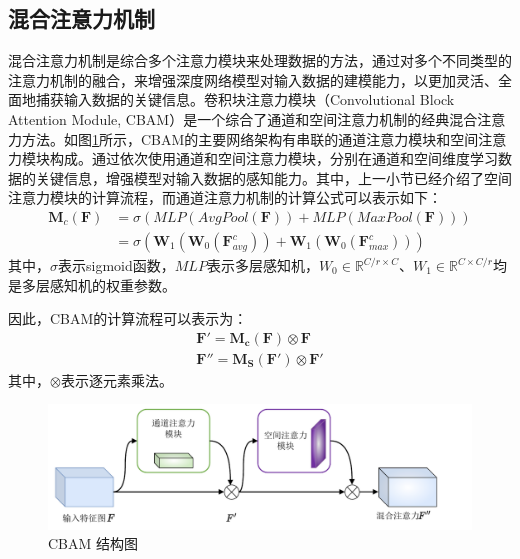 \subsection{混合注意力机制}
混合注意力机制是综合多个注意力模块来处理数据的方法，通过对多个不同类型的注意力机制的融合，来增强深度网络模型对输入数据的建模能力，以更加灵活、全面地捕获输入数据的关键信息。卷积块注意力模块（Convolutional Block Attention Module, CBAM）是一个综合了通道和空间注意力机制的经典混合注意力方法。如图\ref{CBAM}所示，CBAM的主要网络架构有串联的通道注意力模块和空间注意力模块构成。通过依次使用通道和空间注意力模块，分别在通道和空间维度学习数据的关键信息，增强模型对输入数据的感知能力。其中，上一小节已经介绍了空间注意力模块的计算流程，而通道注意力机制的计算公式可以表示如下：
\begin{equation}
    \begin{aligned}
        \mathbf{M}_c\left( \mathbf{F} \right) & =\sigma \left( MLP\left( AvgPool\left( \mathbf{F} \right) \right) +MLP\left( MaxPool\left( \mathbf{F} \right) \right) \right)
        \\
                                              & =\sigma \left( \mathbf{W}_1\left( \mathbf{W}_0\left( \mathbf{F}_{avg}^{c} \right) \right) +\mathbf{W}_1\left( \mathbf{W}_0\left( \mathbf{F}_{max}^{c} \right) \right) \right)
    \end{aligned}
\end{equation}
其中，$\sigma$表示sigmoid函数，$MLP$表示多层感知机，$W_0 \in \mathbb{R}^{C/r\times C}$、$W_1 \in \mathbb{R}^{C\times C/r}$均是多层感知机的权重参数。

因此，CBAM的计算流程可以表示为：
\begin{align}
    \mathbf{F}\prime=\mathbf{M}_{\mathbf{c}}\left( \mathbf{F} \right) \otimes \mathbf{F}
    \\
    \mathbf{F}''=\mathbf{M}_{\mathbf{S}}\left( \mathbf{F}\prime \right) \otimes \mathbf{F}\prime
\end{align}
其中，$\otimes$表示逐元素乘法。

\begin{figure}[h]
    \centering
    \includegraphics[width=14cm]{pic/chapter3/混合注意力.pdf}
    \caption{CBAM 结构图}
    \label{CBAM}
\end{figure}

